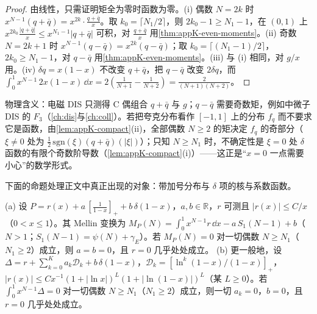 \begin{proof}
由线性，只需证明矩全为零时函数为零。(i) 偶数 $N=2k$ 时 $x^{N-1}(q+\bar q)=x^{2k}\cdot\frac{q+\bar q}{x}$。取 $k_0=\lceil N_1/2\rceil$，则 $2k_0-1\ge N_1-1$，在 $(0,1)$ 上 $x^{2k_0}\frac{|q+\bar q|}{x}\le x^{N_1-1}|q+\bar q|$ 可积，对 $\frac{q+\bar q}{x}$ 用\cref{thm:appK-even-moments}。(ii) 奇数 $N=2k+1$ 时 $x^{N-1}(q-\bar q)=x^{2k}(q-\bar q)$；取 $k_0=\lceil(N_1-1)/2\rceil$，$2k_0\ge N_1-1$，对 $q-\bar q$ 用\cref{thm:appK-even-moments}。(iii) 与 (i) 相同，对 $g/x$ 用。(iv) $\delta q=x(1-x)$ 不改变 $q+\bar q$，把 $q-\bar q$ 改变 $2\delta q$，而 $\int_0^1x^{N-1}\,2x(1-x)\,\dd x=2(\frac1{N+1}-\frac1{N+2})=\frac{2}{(N+1)(N+2)}$。
\end{proof}

物理含义：电磁 DIS 只测得 C 偶组合 $q+\bar q$ 与 $g$；$q-\bar q$ 需要奇数矩，例如中微子 DIS 的 $F_3$（\cref{ch:dis}与\cref{ch:coll}）。若把夸克分布看作 $[-1,1]$ 上的分布 $f_q$ 而不要求它是函数，由\cref{lem:appK-compact}(ii)，全部偶数 $N\ge2$ 的矩决定 $f_q$ 的奇部分（$\xi\ne0$ 处为 $\frac12\,\mathrm{sgn}(\xi)(q+\bar q)(|\xi|)$）；只知 $N\ge N_1$ 时，不确定性是 $\xi=0$ 处 $\delta$ 函数的有限个奇数阶导数（\cref{lem:appK-compact}(i)）——这正是“$x=0$ 一点需要小心”的数学形式。

下面的命题处理正文中真正出现的对象：带加号分布与 $\delta$ 项的核与系数函数。

\begin{proposition}[领头阶核由偶数矩唯一确定]\label{prop:appK-kernels}
(a) 设 $P=r(x)+a\,[\frac1{1-x}]_++b\,\delta(1-x)$，$a,b\in\mathbb R$，$r$ 可测且 $|r(x)|\le C/x$（$0<x\le1$）。其 Mellin 变换为 $M_P(N)=\int_0^1x^{N-1}r\,\dd x-a\,S_1(N-1)+b$（$N>1$；$S_1(N-1)=\psi(N)+\gamma_E$）。若 $M_P(N)=0$ 对一切偶数 $N\ge N_1$（$N_1\ge2$）成立，则 $a=b=0$，且 $r=0$ 几乎处处成立。
(b) 更一般地，设 $\Delta=r+\sum_{k=0}^Ka_k\mathcal D_k+b\,\delta(1-x)$，$\mathcal D_k=[\ln^k(1-x)/(1-x)]_+$，$|r(x)|\le Cx^{-1}(1+|\ln x|)^L(1+|\ln(1-x)|)^L$（某 $L\ge0$）。若 $\int_0^1x^{N-1}\Delta=0$ 对一切偶数 $N\ge N_1$（$N_1\ge2$）成立，则一切 $a_k=0$，$b=0$，且 $r=0$ 几乎处处成立。
\end{proposition}

